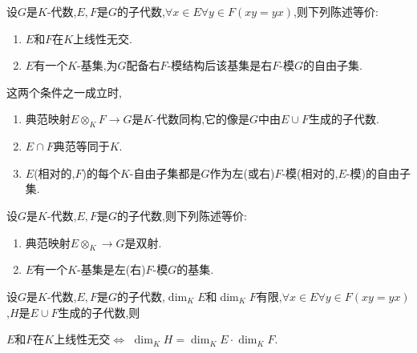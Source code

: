 \begin{proposition}{}{}
	设$G$是$K$-代数,$E,F$是$G$的子代数,$\forall x\in E\forall y\in F\left(xy=yx\right)$,则下列陈述等价:
	\begin{enumerate}
		\item $E$和$F$在$K$上线性无交.
		\item $E$有一个$K$-基集,为$G$配备右$F$-模结构后该基集是右$F$-模$G$的自由子集.
	\end{enumerate}
	这两个条件之一成立时,
	\begin{enumerate}
		\item 典范映射$E\otimes_{K}F\to G$是$K$-代数同构,它的像是$G$中由$E\cup F$生成的子代数.
		\item $E\cap F$典范等同于$K$.
		\item $E$(相对的,$F$)的每个$K$-自由子集都是$G$作为左(或右)$F$-模(相对的,$E$-模)的自由子集.
	\end{enumerate}
\end{proposition}

\begin{corollary}{}{}
	设$G$是$K$-代数,$E,F$是$G$的子代数,则下列陈述等价:
	\begin{enumerate}
		\item 典范映射$E\otimes_{K}\to G$是双射.
		\item $E$有一个$K$-基集是左(右)$F$-模$G$的基集.
	\end{enumerate}
\end{corollary}

\begin{corollary}{}{}
	设$G$是$K$-代数,$E,F$是$G$的子代数,$\dim_{K}E$和$\dim_{K}F$有限,$\forall x\in E\forall y\in F\left(xy=yx\right)$,$H$是$E\cup F$生成的子代数,则
	\begin{center}
		$E$和$F$在$K$上线性无交$\iff$ $\dim_{K}H=\dim_{K}E\cdot\dim_{K}F$.
	\end{center}
\end{corollary}























































